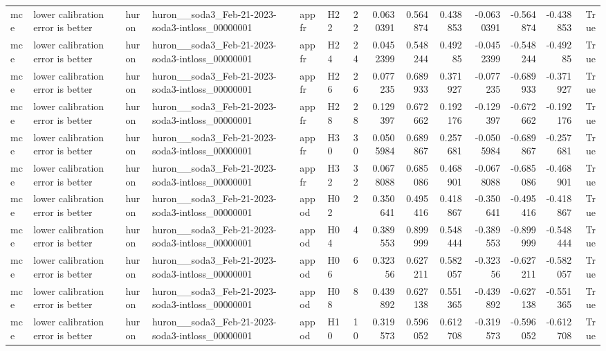 \begin{longtable}{llllllrrrrrrrr}
mce & lower calibration error is better & huron & huron\_\_soda3\_Feb-21-2023-soda3-intloss\_00000001 & appfr & H22 & 22 & 0.0630391 & 0.564874 & 0.438853 & -0.0630391 & -0.564874 & -0.438853 & True \\
mce & lower calibration error is better & huron & huron\_\_soda3\_Feb-21-2023-soda3-intloss\_00000001 & appfr & H24 & 24 & 0.0452399 & 0.548244 & 0.49285 & -0.0452399 & -0.548244 & -0.49285 & True \\
mce & lower calibration error is better & huron & huron\_\_soda3\_Feb-21-2023-soda3-intloss\_00000001 & appfr & H26 & 26 & 0.077235 & 0.689933 & 0.371927 & -0.077235 & -0.689933 & -0.371927 & True \\
mce & lower calibration error is better & huron & huron\_\_soda3\_Feb-21-2023-soda3-intloss\_00000001 & appfr & H28 & 28 & 0.129397 & 0.672662 & 0.192176 & -0.129397 & -0.672662 & -0.192176 & True \\
mce & lower calibration error is better & huron & huron\_\_soda3\_Feb-21-2023-soda3-intloss\_00000001 & appfr & H30 & 30 & 0.0505984 & 0.689867 & 0.257681 & -0.0505984 & -0.689867 & -0.257681 & True \\
mce & lower calibration error is better & huron & huron\_\_soda3\_Feb-21-2023-soda3-intloss\_00000001 & appfr & H32 & 32 & 0.0678088 & 0.685086 & 0.468901 & -0.0678088 & -0.685086 & -0.468901 & True \\
mce & lower calibration error is better & huron & huron\_\_soda3\_Feb-21-2023-soda3-intloss\_00000001 & appod & H02 & 2 & 0.350641 & 0.495416 & 0.418867 & -0.350641 & -0.495416 & -0.418867 & True \\
mce & lower calibration error is better & huron & huron\_\_soda3\_Feb-21-2023-soda3-intloss\_00000001 & appod & H04 & 4 & 0.389553 & 0.899999 & 0.548444 & -0.389553 & -0.899999 & -0.548444 & True \\
mce & lower calibration error is better & huron & huron\_\_soda3\_Feb-21-2023-soda3-intloss\_00000001 & appod & H06 & 6 & 0.32356 & 0.627211 & 0.582057 & -0.32356 & -0.627211 & -0.582057 & True \\
mce & lower calibration error is better & huron & huron\_\_soda3\_Feb-21-2023-soda3-intloss\_00000001 & appod & H08 & 8 & 0.439892 & 0.627138 & 0.551365 & -0.439892 & -0.627138 & -0.551365 & True \\
mce & lower calibration error is better & huron & huron\_\_soda3\_Feb-21-2023-soda3-intloss\_00000001 & appod & H10 & 10 & 0.319573 & 0.596052 & 0.612708 & -0.319573 & -0.596052 & -0.612708 & True \\

\end{longtable}
